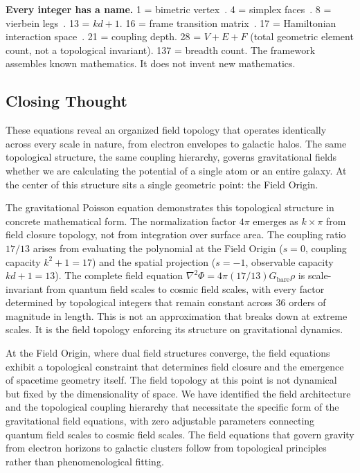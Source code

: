 \documentclass[aps,prd,preprint,superscriptaddress,showpacs,preprintnumbers,amsmath,amssymb,nofootinbib]{revtex4-2}
\begin{document}
\textbf{Every integer has a name.} 1 = bimetric vertex~\cite{hinterbichler2012}. 4 = simplex faces~\cite{ziegler1995}. 8 = vierbein legs~\cite{barbieri1998}. 13 = $kd + 1$. 16 = frame transition matrix~\cite{hassan2012}. 17 = Hamiltonian interaction space~\cite{hassankocic2018}. 21 = coupling depth. 28 = $V + E + F$ (total geometric element count, not a topological invariant). 137 = breadth count. The framework assembles known mathematics. It does not invent new mathematics.

\subsection{Closing Thought}
\label{subsec:closing}

These equations reveal an organized field topology that operates identically across every scale in nature, from electron envelopes to galactic halos. The same topological structure, the same coupling hierarchy, governs gravitational fields whether we are calculating the potential of a single atom or an entire galaxy. At the center of this structure sits a single geometric point: the Field Origin.

The gravitational Poisson equation demonstrates this topological structure in concrete mathematical form. The normalization factor $4\pi$ emerges as $k\times\pi$ from field closure topology, not from integration over surface area. The coupling ratio $17/13$ arises from evaluating the polynomial at the Field Origin ($s=0$, coupling capacity $k^2+1=17$) and the spatial projection ($s=-1$, observable capacity $kd+1=13$). The complete field equation $\nabla^2\Phi = 4\pi(17/13)G_{\text{bare}}\rho$ is scale-invariant from quantum field scales to cosmic field scales, with every factor determined by topological integers that remain constant across 36 orders of magnitude in length. This is not an approximation that breaks down at extreme scales. It is the field topology enforcing its structure on gravitational dynamics.

At the Field Origin, where dual field structures converge, the field equations exhibit a topological constraint that determines field closure and the emergence of spacetime geometry itself. The field topology at this point is not dynamical but fixed by the dimensionality of space. We have identified the field architecture and the topological coupling hierarchy that necessitate the specific form of the gravitational field equations, with zero adjustable parameters connecting quantum field scales to cosmic field scales. The field equations that govern gravity from electron horizons to galactic clusters follow from topological principles rather than phenomenological fitting.
\end{document}
